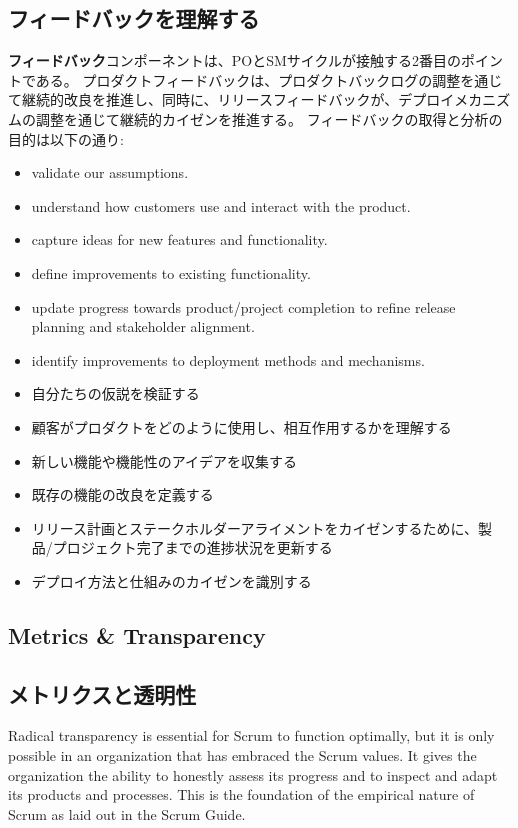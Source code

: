 \documentclass[12pt,a4paper,parskip=full]{scrartcl}
\begin{document}
\subsection{フィードバックを理解する}
\textbf{フィードバック}コンポーネントは、POとSMサイクルが接触する2番目のポイントである。
プロダクトフィードバックは、プロダクトバックログの調整を通じて継続的改良を推進し、同時に、リリースフィードバックが、デプロイメカニズムの調整を通じて継続的カイゼンを推進する。
フィードバックの取得と分析の目的は以下の通り:
\begin{itemize}
\item validate our assumptions.
\item understand how customers use and interact with the product.
\item capture ideas for new features and functionality.
\item define improvements to existing functionality.
\item update progress towards product/project completion to refine release
planning and stakeholder alignment.
\item identify improvements to deployment methods and mechanisms.
\end{itemize}
\fi
\begin{itemize}
\item 自分たちの仮説を検証する
\item 顧客がプロダクトをどのように使用し、相互作用するかを理解する
\item 新しい機能や機能性のアイデアを収集する
\item 既存の機能の改良を定義する
\item リリース計画とステークホルダーアライメントをカイゼンするために、製品/プロジェクト完了までの進捗状況を更新する
\item デプロイ方法と仕組みのカイゼンを識別する
\end{itemize}

\subsection{Metrics \& Transparency}
\fi
\subsection{メトリクスと透明性}
Radical transparency is essential for Scrum to function optimally, but it
is only possible in an organization that has embraced the Scrum values. It
gives the organization the ability to honestly assess its progress and to
inspect and adapt its products and processes. This is the foundation of the
empirical nature of Scrum as laid out in the Scrum Guide.
\end{document}
